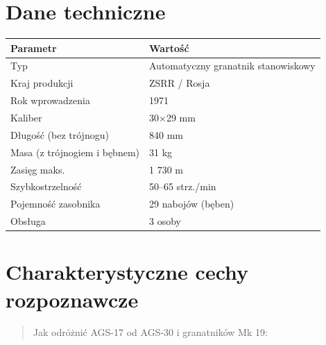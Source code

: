\documentclass[12pt,openany,oneside]{book}
\begin{document}
\section{Dane techniczne}\label{dane-techniczne-82}

\begin{longtable}[]{@{}ll@{}}
\toprule\noalign{}
Parametr & Wartość \\
\midrule\noalign{}
\endhead
\bottomrule\noalign{}
\endlastfoot
Typ & Automatyczny granatnik stanowiskowy \\
Kraj produkcji & ZSRR / Rosja \\
Rok wprowadzenia & 1971 \\
Kaliber & 30×29 mm \\
Długość (bez trójnogu) & 840 mm \\
Masa (z trójnogiem i bębnem) & 31 kg \\
Zasięg maks. & 1 730 m \\
Szybkostrzelność & 50--65 strz./min \\
Pojemność zasobnika & 29 nabojów (bęben) \\
Obsługa & 3 osoby \\
\end{longtable}

\section{Charakterystyczne cechy
rozpoznawcze}\label{charakterystyczne-cechy-rozpoznawcze-82}

\begin{quote}
Jak odróżnić AGS-17 od AGS-30 i granatników Mk 19:
\end{quote}
\end{document}
